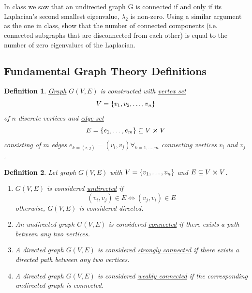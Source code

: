 \documentclass[]{article}
\numberwithin{equation}{section}
\newtheorem{definition}{Definition}
\begin{document}
\newpage
\section{}
In class we saw that an undirected graph G is connected if and only if its Laplacian’s second smallest eigenvalue, $\lambda_2$ is non-zero. 
Using a similar argument as the one in class, show that the number of connected components (i.e. connected subgraphs that are disconnected from each other) is equal to the number of zero eigenvalues of the Laplacian.

\subsection{Fundamental Graph Theory Definitions}
\begin{definition} \label{def:graph_def}
	\underline{\emph{Graph}} $G(V,E)$ is constructed with \underline{\emph{vertex set}} \[
		V = \qty{v_1,v_2,\dots,v_n}
	\] of $n$ discrete vertices and \emph{\underline{edge set}} \[
		E = \qty{e_1, \dots, e_m} \subseteq V \cross V
	\] consisting of $m$ edges $e_{k=(i,j)} = (v_i,v_j) \forall_{k=1,\dots,m}$ connecting vertices $v_i$ and $v_j$.
\end{definition}

\begin{definition} \label{def:graph_properties}
	Let graph $G(V,E)$ with $V = \qty{v_1,\dots,v_n}$ and $E \subseteq V \cross V$.
	\begin{enumerate}
		\item $G(V,E)$ is considered \underline{\emph{undirected}} if\[
			(v_i,v_j) \in E \iff (v_j,v_i) \in E
		\] otherwise, $G(V,E)$ is considered \emph{directed}.
		\item An undirected graph $G(V,E)$ is considered \underline{\emph{connected}} if there exists a path between any two vertices.
		\item A directed graph $G(V,E)$ is considered \underline{\emph{strongly connected}} if there exists a directed path between any two vertices.
		\item A directed graph $G(V,E)$ is considered \underline{\emph{weakly connected}} if the corresponding undirected graph is connected.
	\end{enumerate}
\end{definition}
\end{document}
